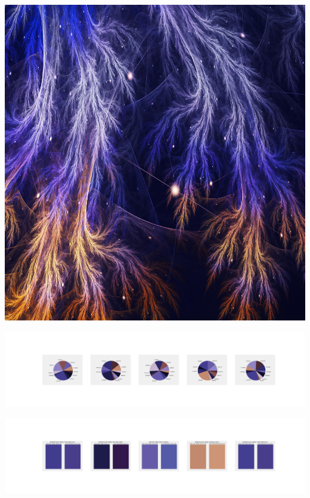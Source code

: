 \documentclass[11pt]{article}
\begin{document}
\begin{landscape}
    \begin{center}
    \includegraphics[width=\textwidth]{./nbimg/file (108).jpg}
    \end{center}

    \begin{center}
    \includegraphics[width=250mm]{./nbimg/pie-10.jpg}
    \end{center}

    \begin{center}
    \includegraphics[width=250mm]{./nbimg/peak-10.jpg}
    \end{center}
    


\end{landscape}
\end{document}
